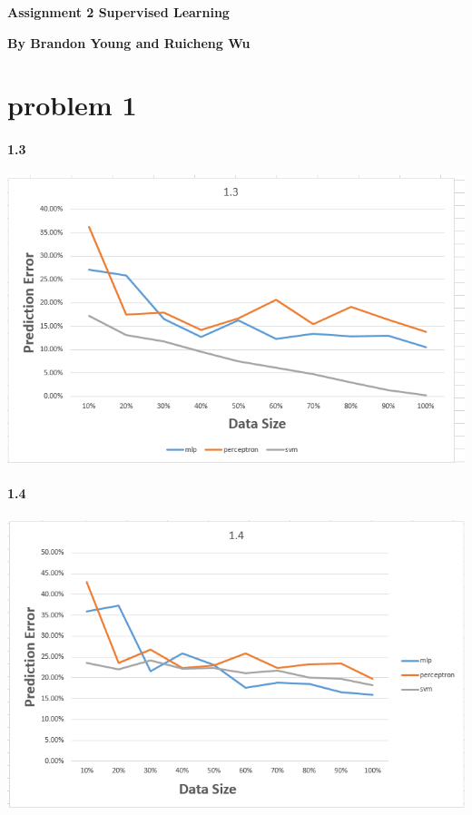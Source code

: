\documentclass[12pt, letterpaper]{article}
\begin{document}
	\textbf{\large Assignment 2 Supervised Learning}\newline
	
	\textbf{By Brandon Young and Ruicheng Wu}
	\section{problem 1}
	
	\paragraph{1.3\newline}
	\includegraphics[scale=0.8]{"problem-1-3"}
	
	\paragraph{1.4\newline}
	\includegraphics[scale=0.8]{"problem-1-4"}
	
\end{document}
